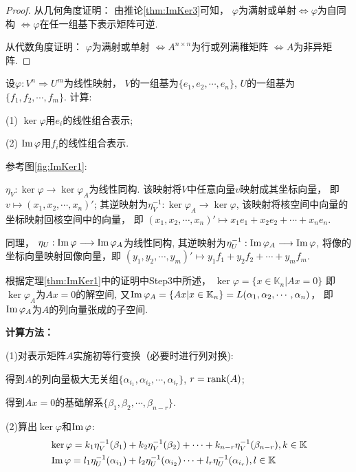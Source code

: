 \begin{proof}
  从几何角度证明：
  由推论\ref{thm:ImKer3}可知，
  $\varphi$为满射或单射$\Longleftrightarrow \varphi$为自同构
  $\Longleftrightarrow \varphi$在任一组基下表示矩阵可逆.

  从代数角度证明：
  $\varphi$为满射或单射 $\Longleftrightarrow A^{n \times n}$为行或列满稚矩阵
  $\Longleftrightarrow A$为非异矩阵. 
\end{proof}

\begin{example}
  设$\varphi: V^n \Longrightarrow U^m$为线性映射，
  $V$的一组基为$\{e_1, e_2,\cdots,e_n\}$,
  $U$的一组基为$\{f_1, f_2,\cdots,f_m\}$.
  计算:

  (1) $\ker\varphi$用$e_i$的线性组合表示;

  (2) $\operatorname{Im}\varphi$用$f_i$的线性组合表示. 
\end{example}

\begin{solution}
  参考图\ref{fig:ImKer1}:
  
  $\eta_V: \ker\varphi \longrightarrow \ker\varphi_A$为线性同构.
  该映射将$V$中任意向量$v$映射成其坐标向量， 即
  $v \mapsto (x_1, x_2,\cdots,x_n)'$; 
  其逆映射为$\eta_V^{-1}: \ker\varphi_A \longrightarrow \ker\varphi$,
  该映射将核空间中向量的坐标映射回核空间中的向量， 即
  $(x_1, x_2, \cdots, x_n)' \mapsto x_1e_1 + x_2e_2+ \cdots + x_ne_n$. 

  同理， $\eta_U: \operatorname{Im}\varphi \longrightarrow \operatorname{Im}\varphi_A$为线性同构,
  其逆映射为$\eta_U^{-1}: \operatorname{Im}\varphi_A \longrightarrow \operatorname{Im}\varphi$, 
  将像的坐标向量映射回像向量，即
  $(y_1, y_2, \cdots, y_m)' \mapsto y_1f_1 + y_2f_2+ \cdots + y_mf_m$.

  根据定理\ref{thm:ImKer1}中的证明中Step3中所述，
  $\ker\varphi =\{x \in \mathbb{K}_n|Ax=0\}$
  即$\ker\varphi_A$为$Ax = 0$的解空间,
  又$\operatorname{Im}\varphi_A = \{Ax|x \in \mathbb{K}_n\}
  = L(\alpha_1, \alpha_2, \cdots, \alpha_n)$， 即
  $\operatorname{Im}\varphi_A$为$A$的列向量张成的子空间.

  \textbf{计算方法：}

  (1)对表示矩阵$A$实施初等行变换（必要时进行列对换):
  
  得到$A$的列向量极大无关组$\{\alpha_{i_1},\alpha_{i_2},\cdots,\alpha_{i_r}\}$,
  $r = \operatorname{rank}(A)$;

  得到$Ax=0$的基础解系$\{\beta_1,\beta_2,\cdots,\beta_{n-r}\}$.
  
  (2)算出$\ker\varphi$和$\operatorname{Im}\varphi$: 
  \begin{align*}
       & \ker\varphi = k_1\eta_V^{-1}(\beta_1)+k_2\eta_V^{-1}(\beta_2)
         +\cdots+k_{n-r}\eta_V^{-1}(\beta_{n-r}), k \in \mathbb{K}\\
       & \operatorname{Im}\varphi = l_1\eta_U^{-1}(\alpha_{i_1})+l_2\eta_U^{-1}(\alpha_{i_2})
         \cdots+l_r\eta_U^{-1}(\alpha_{i_r}), l \in \mathbb{K}      
   \end{align*} 
 \end{solution}

